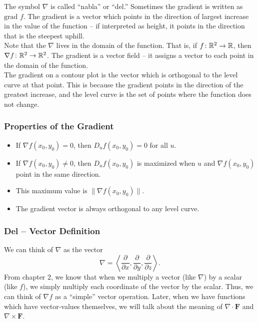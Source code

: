 The symbol \(\nabla\) is called “nabla” or “del.” Sometimes the gradient is written as \(\text{grad } f\). The gradient is a vector which points in the direction of largest increase in the value of the function – if interpreted as height, it points in the direction that is the steepest uphill. \\

Note that the \(\nabla\) lives in the domain of the function. That is, if \(f \colon \mathbb{R}^{2} \to \mathbb{R}\), then \(\nabla f \colon \mathbb{R}^{2} \to \mathbb{R}^{2}\). The gradient is a vector field – it assigns a vector to each point in the domain of the function. \\

The gradient on a contour plot is the vector which is orthogonal to the level curve at that point. This is because the gradient points in the direction of the greatest increase, and the level curve is the set of points where the function does not change.

\subsubsection{Properties of the Gradient}

\begin{itemize}
    \item If \(\nabla f(x_{0}, y_{0}) = 0\), then \(D_{u}f(x_{0}, y_{0}) = 0\) for all \(u\).
    \item If \(\nabla f(x_{0}, y_{0}) \neq 0\), then \(D_{u}f(x_{0}, y_{0})\) is maximized when \(u\) and \(\nabla f(x_{0}, y_{0})\) point in the same direction.
    \item This maximum value is \(\| \nabla f(x_{0}, y_{0}) \|\).
    \item The gradient vector is always orthogonal to any level curve.
\end{itemize}

\subsubsection{Del – Vector Definition}

We can think of \(\nabla\) as the vector
\[
\nabla = \left\langle \dfrac{\partial}{\partial x}, \dfrac{\partial}{\partial y}, \dfrac{\partial}{\partial z} \right\rangle.
\]
From chapter 2, we know that when we multiply a vector (like \(\nabla\)) by a scalar (like \(f\)), we simply multiply each coordinate of the vector by the scalar. Thus, we can think of \(\nabla f\) as a “simple” vector operation. Later, when we have functions which have vector-values themselves, we will talk about the meaning of \(\nabla \cdot \mathbf{F}\) and \(\nabla \times \mathbf{F}\). \\ 

